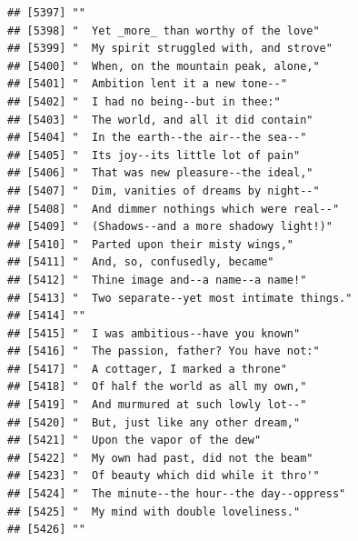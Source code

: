 \documentclass{article}\usepackage[]{graphicx}\usepackage[]{color}
\makeatletter
\newenvironment{kframe}{%
 \def\at@end@of@kframe{}%
 \ifinner\ifhmode%
  \def\at@end@of@kframe{\end{minipage}}%
  \begin{minipage}{\columnwidth}%
 \fi\fi%
 \def\FrameCommand##1{\hskip\@totalleftmargin \hskip-\fboxsep
 \colorbox{shadecolor}{##1}\hskip-\fboxsep
     \hskip-\linewidth \hskip-\@totalleftmargin \hskip\columnwidth}%
 \MakeFramed {\advance\hsize-\width
   \@totalleftmargin\z@ \linewidth\hsize
   \@setminipage}}%
 {\par\unskip\endMakeFramed%
 \at@end@of@kframe}
\newenvironment{knitrout}{}{} %
\makeatother
\begin{document}
\begin{knitrout}
\begin{kframe}
\begin{verbatim}
## [5397] ""                                                                            
## [5398] "  Yet _more_ than worthy of the love"                                        
## [5399] "  My spirit struggled with, and strove"                                      
## [5400] "  When, on the mountain peak, alone,"                                        
## [5401] "  Ambition lent it a new tone--"                                             
## [5402] "  I had no being--but in thee:"                                              
## [5403] "  The world, and all it did contain"                                         
## [5404] "  In the earth--the air--the sea--"                                          
## [5405] "  Its joy--its little lot of pain"                                           
## [5406] "  That was new pleasure--the ideal,"                                         
## [5407] "  Dim, vanities of dreams by night--"                                        
## [5408] "  And dimmer nothings which were real--"                                     
## [5409] "  (Shadows--and a more shadowy light!)"                                      
## [5410] "  Parted upon their misty wings,"                                            
## [5411] "  And, so, confusedly, became"                                               
## [5412] "  Thine image and--a name--a name!"                                          
## [5413] "  Two separate--yet most intimate things."                                   
## [5414] ""                                                                            
## [5415] "  I was ambitious--have you known"                                           
## [5416] "  The passion, father? You have not:"                                        
## [5417] "  A cottager, I marked a throne"                                             
## [5418] "  Of half the world as all my own,"                                          
## [5419] "  And murmured at such lowly lot--"                                          
## [5420] "  But, just like any other dream,"                                           
## [5421] "  Upon the vapor of the dew"                                                 
## [5422] "  My own had past, did not the beam"                                         
## [5423] "  Of beauty which did while it thro'"                                        
## [5424] "  The minute--the hour--the day--oppress"                                    
## [5425] "  My mind with double loveliness."                                           
## [5426] ""                                                                            

\end{verbatim}
\end{kframe}
\end{knitrout}
\end{document}
